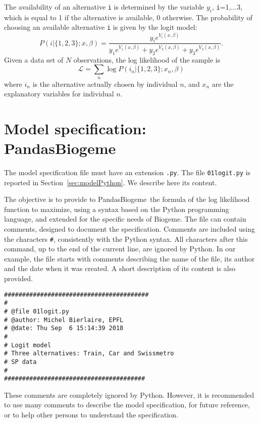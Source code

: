 \documentclass[12pt,a4paper]{article}
\renewcommand{\L}{\mathcal{L}}
\newcommand{\PDBIOGEME}{PandasBiogeme}
\newcommand{\BIOGEME}{Biogeme}
\begin{document}
The availability of an alternative \texttt{i} is determined by the
variable $y_i$, \texttt{i}=1,...3, which is equal to 1 if the
alternative is available, 0 otherwise. The probability of choosing an
available alternative \texttt{i} is given by the logit model: 
\begin{equation}
P(i|\{1,2,3\};x,\beta) = \frac{y_i e^{V_i(x,\beta)}}{y_1 e^{V_1(x,\beta)} + y_2 e^{V_2(x,\beta)}+ y_3 e^{V_3(x,\beta)}}.
\end{equation}
Given a data set of $N$ observations, the log likelihood of the
sample is 
\begin{equation}
\L = \sum_n \log P(i_n|\{1,2,3\};x_n,\beta)
\end{equation}
where $i_n$ is the alternative actually chosen
by individual $n$, and $x_n$ are the explanatory variables for
individual $n$.  

\section{Model specification: \PDBIOGEME}
\label{sec:mod}

The model specification file must have an extension \lstinline$.py$. 
The file \lstinline$01logit.py$ is reported in
Section~\ref{sec:modelPython}. We describe here its content. 

The objective is to provide to \PDBIOGEME\ the formula of the log
likelihood function to maximize, using a syntax based on the Python
programming language, and extended for the specific needs of \BIOGEME.
The file can
contain comments, designed to document the specification. 
Comments are included using the characters \verb+#+, consistently with
the Python syntax. All characters
after this command, up to the end of the current line, are ignored by Python.
In our example, the file starts with comments describing the name of
the file, its author and the date when it was created. A short
description of its content is also provided. 
\begin{lstlisting}[style=nonumbers]
########################################
#
# @file 01logit.py
# @author: Michel Bierlaire, EPFL
# @date: Thu Sep  6 15:14:39 2018
#
# Logit model
# Three alternatives: Train, Car and Swissmetro
# SP data
#
#######################################
\end{lstlisting}
These comments are
completely ignored by Python. However, it is recommended to use
many comments to describe the model specification, for future
reference, or to help other persons to understand the specification. 
\end{document}
